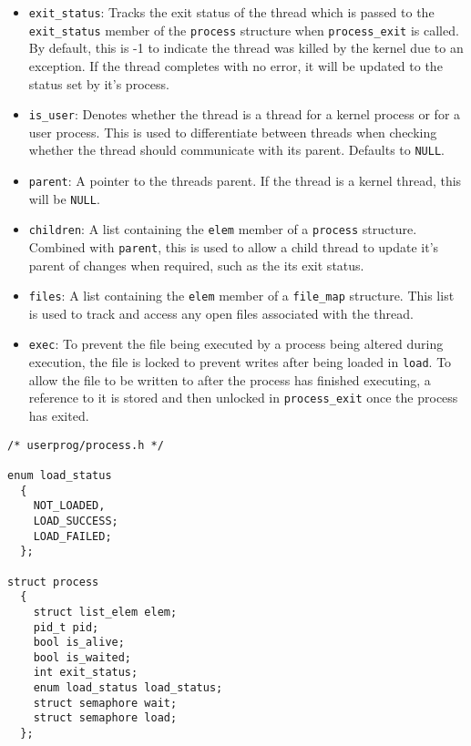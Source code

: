 \documentclass{article}
\begin{document}
\begin{itemize}
    \item \verb!exit_status!: Tracks the exit status of the thread which is passed to the \verb!exit_status! member of the \verb!process! structure when \verb!process_exit! is called. By default, this is -1 to indicate the thread was killed by the kernel due to an exception. If the thread completes with no error, it will be updated to the status set by it's process.

    \item \verb!is_user!: Denotes whether the thread is a thread for a kernel process or for a user process. This is used to differentiate between threads when checking whether the thread should communicate with its parent. Defaults to \verb!NULL!.

    \item \verb!parent!: A pointer to the threads parent. If the thread is a kernel thread, this will be \verb!NULL!.

    \item \verb!children!: A list containing the \verb!elem! member of a \verb!process! structure. Combined with \verb!parent!, this is used to allow a child thread to update it's parent of changes when required, such as the its exit status.

    \item \verb!files!: A list containing the \verb!elem! member of a \verb!file_map! structure. This list is used to track and access any open files associated with the thread.

    \item \verb!exec!: To prevent the file being executed by a process being altered during execution, the file is locked to prevent writes after being loaded in \verb!load!. To allow the file to be written to after the process has finished executing, a reference to it is stored and then unlocked in \verb!process_exit! once the process has exited.
\end{itemize}

\begin{verbatim}
/* userprog/process.h */

enum load_status
  {
    NOT_LOADED,
    LOAD_SUCCESS;
    LOAD_FAILED;
  };

struct process
  {
    struct list_elem elem;
    pid_t pid;
    bool is_alive;
    bool is_waited;
    int exit_status;
    enum load_status load_status;
    struct semaphore wait;
    struct semaphore load;
  };
\end{verbatim}
\end{document}
